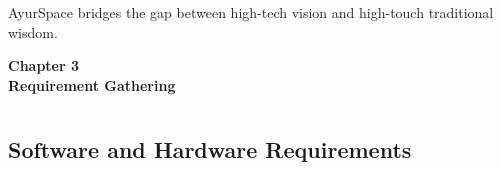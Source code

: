 \documentclass[12pt, a4paper]{report}
\begin{document}
AyurSpace bridges the gap between high-tech vision and high-touch traditional wisdom.


\newpage
\vspace*{\fill}
\begin{center}
\textbf{\Huge{Chapter 3}}\\
\vspace{5mm}
\textbf{\Huge{Requirement Gathering}}
\end{center}
\vspace*{\fill}
\newpage
\titleformat{\chapter}[block]{\normalfont}{}{0pt}{}
\titlespacing{\chapter}{0pt}{-2em}{0pt}
\chapter[Requirement Gathering]{}
\titleformat{\chapter}[display]{\vspace{1cm}\normalfont\Large\bfseries\centering}{\chaptertitlename\ \thechapter}{20pt}{\vspace{0pt}}
\titlespacing*{\chapter}{0pt}{-50pt}{20pt}

\section{Software and Hardware Requirements}

\justify
\end{document}
